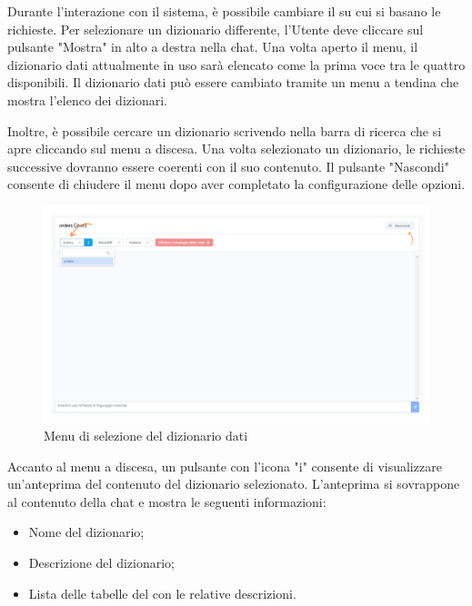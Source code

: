 
\par Durante l'interazione con il sistema, è possibile cambiare il  su cui si basano le richieste. Per selezionare un dizionario differente, l'Utente deve cliccare sul pulsante "Mostra" in alto a destra nella chat. Una volta aperto il menu, il dizionario dati attualmente in uso sarà elencato come la prima voce tra le quattro disponibili. Il dizionario dati può essere cambiato tramite un menu a tendina che mostra l'elenco dei dizionari.

\par Inoltre, è possibile cercare un dizionario scrivendo nella barra di ricerca che si apre cliccando sul menu a discesa. Una volta selezionato un dizionario, le richieste successive dovranno essere coerenti con il suo contenuto. Il pulsante "Nascondi" consente di chiudere il menu dopo aver completato la configurazione delle opzioni.

\begin{figure}[H]
  \centering
  \includegraphics[width=\textwidth]{assets/cambio_dizionariodati.png}
  \caption{Menu di selezione del dizionario dati}
\end{figure}

 \label{sec:info-dizionario}

\par Accanto al menu a discesa, un pulsante con l'icona "i" consente di visualizzare un'anteprima del contenuto del dizionario selezionato. L'anteprima si sovrappone al contenuto della chat e mostra le seguenti informazioni:
\begin{itemize}
  \item Nome del dizionario;
  \item Descrizione del dizionario;
  \item Lista delle tabelle del  con le relative descrizioni.
\end{itemize}

